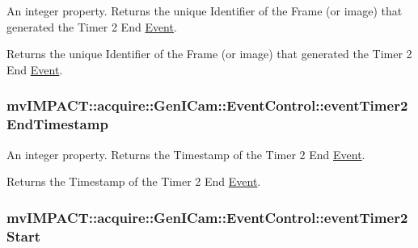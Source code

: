 An integer property. Returns the unique Identifier of the Frame (or image) that generated the Timer 2 End \hyperlink{classmv_i_m_p_a_c_t_1_1acquire_1_1_event}{Event}. 

Returns the unique Identifier of the Frame (or image) that generated the Timer 2 End \hyperlink{classmv_i_m_p_a_c_t_1_1acquire_1_1_event}{Event}. \hypertarget{classmv_i_m_p_a_c_t_1_1acquire_1_1_gen_i_cam_1_1_event_control_a89fbc4d6aa6bc92f19a5d43a4c2335f1}{
\subsubsection[{event\+Timer2\+End\+Timestamp}]{ mv\+I\+M\+P\+A\+C\+T\+::acquire\+::\+Gen\+I\+Cam\+::\+Event\+Control\+::event\+Timer2\+End\+Timestamp}}\label{classmv_i_m_p_a_c_t_1_1acquire_1_1_gen_i_cam_1_1_event_control_a89fbc4d6aa6bc92f19a5d43a4c2335f1}


An integer property. Returns the Timestamp of the Timer 2 End \hyperlink{classmv_i_m_p_a_c_t_1_1acquire_1_1_event}{Event}. 

Returns the Timestamp of the Timer 2 End \hyperlink{classmv_i_m_p_a_c_t_1_1acquire_1_1_event}{Event}. \hypertarget{classmv_i_m_p_a_c_t_1_1acquire_1_1_gen_i_cam_1_1_event_control_a327ff015798aee0d2e400ede19288687}{
\subsubsection[{event\+Timer2\+Start}]{ mv\+I\+M\+P\+A\+C\+T\+::acquire\+::\+Gen\+I\+Cam\+::\+Event\+Control\+::event\+Timer2\+Start}}\label{classmv_i_m_p_a_c_t_1_1acquire_1_1_gen_i_cam_1_1_event_control_a327ff015798aee0d2e400ede19288687}


